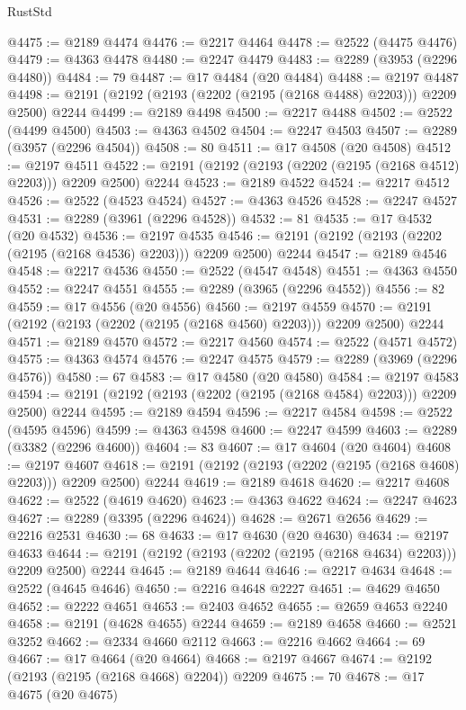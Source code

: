 \begin{lexlean}{RustStd}
\begin{coremodule}
@4475 := @2189 @4474
@4476 := @2217 @4464
@4478 := @2522 (@4475 @4476)
@4479 := @4363 @4478
@4480 := @2247 @4479
@4483 := @2289 (@3953 (@2296 @4480))
@4484 := 79
@4487 := @17 @4484 (@20 @4484)
@4488 := @2197 @4487
@4498 := @2191 (@2192 (@2193 (@2202 (@2195 (@2168 @4488) @2203))) @2209 @2500) @2244
@4499 := @2189 @4498
@4500 := @2217 @4488
@4502 := @2522 (@4499 @4500)
@4503 := @4363 @4502
@4504 := @2247 @4503
@4507 := @2289 (@3957 (@2296 @4504))
@4508 := 80
@4511 := @17 @4508 (@20 @4508)
@4512 := @2197 @4511
@4522 := @2191 (@2192 (@2193 (@2202 (@2195 (@2168 @4512) @2203))) @2209 @2500) @2244
@4523 := @2189 @4522
@4524 := @2217 @4512
@4526 := @2522 (@4523 @4524)
@4527 := @4363 @4526
@4528 := @2247 @4527
@4531 := @2289 (@3961 (@2296 @4528))
@4532 := 81
@4535 := @17 @4532 (@20 @4532)
@4536 := @2197 @4535
@4546 := @2191 (@2192 (@2193 (@2202 (@2195 (@2168 @4536) @2203))) @2209 @2500) @2244
@4547 := @2189 @4546
@4548 := @2217 @4536
@4550 := @2522 (@4547 @4548)
@4551 := @4363 @4550
@4552 := @2247 @4551
@4555 := @2289 (@3965 (@2296 @4552))
@4556 := 82
@4559 := @17 @4556 (@20 @4556)
@4560 := @2197 @4559
@4570 := @2191 (@2192 (@2193 (@2202 (@2195 (@2168 @4560) @2203))) @2209 @2500) @2244
@4571 := @2189 @4570
@4572 := @2217 @4560
@4574 := @2522 (@4571 @4572)
@4575 := @4363 @4574
@4576 := @2247 @4575
@4579 := @2289 (@3969 (@2296 @4576))
@4580 := 67
@4583 := @17 @4580 (@20 @4580)
@4584 := @2197 @4583
@4594 := @2191 (@2192 (@2193 (@2202 (@2195 (@2168 @4584) @2203))) @2209 @2500) @2244
@4595 := @2189 @4594
@4596 := @2217 @4584
@4598 := @2522 (@4595 @4596)
@4599 := @4363 @4598
@4600 := @2247 @4599
@4603 := @2289 (@3382 (@2296 @4600))
@4604 := 83
@4607 := @17 @4604 (@20 @4604)
@4608 := @2197 @4607
@4618 := @2191 (@2192 (@2193 (@2202 (@2195 (@2168 @4608) @2203))) @2209 @2500) @2244
@4619 := @2189 @4618
@4620 := @2217 @4608
@4622 := @2522 (@4619 @4620)
@4623 := @4363 @4622
@4624 := @2247 @4623
@4627 := @2289 (@3395 (@2296 @4624))
@4628 := @2671 @2656
@4629 := @2216 @2531
@4630 := 68
@4633 := @17 @4630 (@20 @4630)
@4634 := @2197 @4633
@4644 := @2191 (@2192 (@2193 (@2202 (@2195 (@2168 @4634) @2203))) @2209 @2500) @2244
@4645 := @2189 @4644
@4646 := @2217 @4634
@4648 := @2522 (@4645 @4646)
@4650 := @2216 @4648 @2227
@4651 := @4629 @4650
@4652 := @2222 @4651
@4653 := @2403 @4652
@4655 := @2659 @4653 @2240
@4658 := @2191 (@4628 @4655) @2244
@4659 := @2189 @4658
@4660 := @2521 @3252
@4662 := @2334 @4660 @2112
@4663 := @2216 @4662
@4664 := 69
@4667 := @17 @4664 (@20 @4664)
@4668 := @2197 @4667
@4674 := @2192 (@2193 (@2195 (@2168 @4668) @2204)) @2209
@4675 := 70
@4678 := @17 @4675 (@20 @4675)

\end{coremodule}
\end{lexlean}
